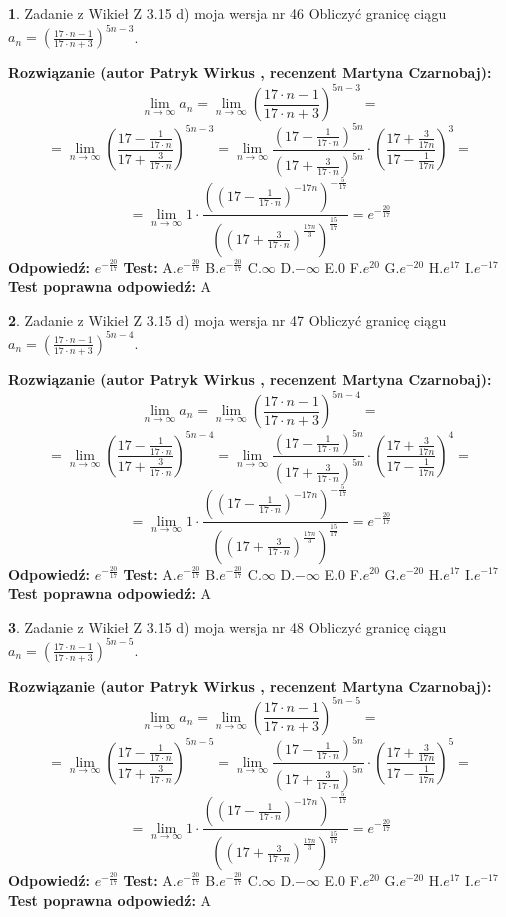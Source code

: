 \documentclass[12pt, a4paper]{article}
\theoremstyle{definition} %
\newtheorem{zad}{}
\newcommand{\zadStart}[1]{\begin{zad}#1\newline}
\newcommand{\zadStop}{\end{zad}}
\newcommand{\rozwStart}[2]{\noindent \textbf{Rozwiązanie (autor #1 , recenzent #2): }\newline}
\newcommand{\rozwStop}{\newline}
\newcommand{\odpStart}{\noindent \textbf{Odpowiedź:}\newline}
\newcommand{\odpStop}{\newline}
\newcommand{\testStart}{\noindent \textbf{Test:}\newline}
\newcommand{\testStop}{\newline}
\newcommand{\kluczStart}{\noindent \textbf{Test poprawna odpowiedź:}\newline}
\newcommand{\kluczStop}{\newline}
\begin{document}
\zadStart{Zadanie z Wikieł Z 3.15 d) moja wersja nr 46}
Obliczyć granicę ciągu $a_{n}=(\frac{17\cdot n - 1}{17 \cdot n + 3})^{5n-3}$.
\zadStop
\rozwStart{Patryk Wirkus}{Martyna Czarnobaj}
$$\lim\limits_{n\to\infty} a_{n} = \lim\limits_{n\to\infty}(\frac{17\cdot n - 1}{17 \cdot n + 3})^{5n-3}=$$
$$=\lim\limits_{n\to\infty}(\frac{17 - \frac{1}{17\cdot n}}{17 + \frac{3}{17 \cdot n}})^{5n-3}=\lim\limits_{n\to\infty}\frac{(17 - \frac{1}{17\cdot n})^{5n}}{(17 + \frac{3}{17\cdot n})^{5n}} \cdot (\frac{17+\frac{3}{17n}}{17-\frac{1}{17n}})^{3}=$$
$$=\lim\limits_{n\to\infty} 1 \cdot \frac{((17-\frac{1}{17 \cdot n})^{-17n})^{-\frac{5}{17}}}{((17+\frac{3}{17 \cdot n})^{\frac{17n}{3}})^{\frac{15}{17}}} =e^{-\frac{20}{17}}$$
\rozwStop
\odpStart
$e^{-\frac{20}{17}}$
\odpStop
\testStart
A.$ e^{-\frac{20}{17}}$
B.$ e^{-\frac{20}{17}}$
C.$\infty$
D.$-\infty$
E.$0$
F.$e^{20}$
G.$e^{-20}$
H.$e^{17}$
I.$e^{-17}$
\testStop
\kluczStart
A
\kluczStop



\zadStart{Zadanie z Wikieł Z 3.15 d) moja wersja nr 47}
Obliczyć granicę ciągu $a_{n}=(\frac{17\cdot n - 1}{17 \cdot n + 3})^{5n-4}$.
\zadStop
\rozwStart{Patryk Wirkus}{Martyna Czarnobaj}
$$\lim\limits_{n\to\infty} a_{n} = \lim\limits_{n\to\infty}(\frac{17\cdot n - 1}{17 \cdot n + 3})^{5n-4}=$$
$$=\lim\limits_{n\to\infty}(\frac{17 - \frac{1}{17\cdot n}}{17 + \frac{3}{17 \cdot n}})^{5n-4}=\lim\limits_{n\to\infty}\frac{(17 - \frac{1}{17\cdot n})^{5n}}{(17 + \frac{3}{17\cdot n})^{5n}} \cdot (\frac{17+\frac{3}{17n}}{17-\frac{1}{17n}})^{4}=$$
$$=\lim\limits_{n\to\infty} 1 \cdot \frac{((17-\frac{1}{17 \cdot n})^{-17n})^{-\frac{5}{17}}}{((17+\frac{3}{17 \cdot n})^{\frac{17n}{3}})^{\frac{15}{17}}} =e^{-\frac{20}{17}}$$
\rozwStop
\odpStart
$e^{-\frac{20}{17}}$
\odpStop
\testStart
A.$ e^{-\frac{20}{17}}$
B.$ e^{-\frac{20}{17}}$
C.$\infty$
D.$-\infty$
E.$0$
F.$e^{20}$
G.$e^{-20}$
H.$e^{17}$
I.$e^{-17}$
\testStop
\kluczStart
A
\kluczStop



\zadStart{Zadanie z Wikieł Z 3.15 d) moja wersja nr 48}
Obliczyć granicę ciągu $a_{n}=(\frac{17\cdot n - 1}{17 \cdot n + 3})^{5n-5}$.
\zadStop
\rozwStart{Patryk Wirkus}{Martyna Czarnobaj}
$$\lim\limits_{n\to\infty} a_{n} = \lim\limits_{n\to\infty}(\frac{17\cdot n - 1}{17 \cdot n + 3})^{5n-5}=$$
$$=\lim\limits_{n\to\infty}(\frac{17 - \frac{1}{17\cdot n}}{17 + \frac{3}{17 \cdot n}})^{5n-5}=\lim\limits_{n\to\infty}\frac{(17 - \frac{1}{17\cdot n})^{5n}}{(17 + \frac{3}{17\cdot n})^{5n}} \cdot (\frac{17+\frac{3}{17n}}{17-\frac{1}{17n}})^{5}=$$
$$=\lim\limits_{n\to\infty} 1 \cdot \frac{((17-\frac{1}{17 \cdot n})^{-17n})^{-\frac{5}{17}}}{((17+\frac{3}{17 \cdot n})^{\frac{17n}{3}})^{\frac{15}{17}}} =e^{-\frac{20}{17}}$$
\rozwStop
\odpStart
$e^{-\frac{20}{17}}$
\odpStop
\testStart
A.$ e^{-\frac{20}{17}}$
B.$ e^{-\frac{20}{17}}$
C.$\infty$
D.$-\infty$
E.$0$
F.$e^{20}$
G.$e^{-20}$
H.$e^{17}$
I.$e^{-17}$
\testStop
\kluczStart
A
\kluczStop
\end{document}
